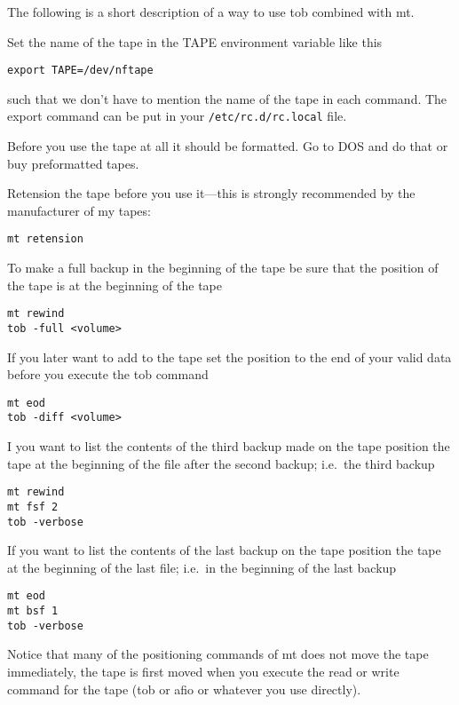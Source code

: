 \documentclass[12pt,a4paper]{article}
\begin{document}
\pagestyle{empty}

\parskip6pt
\parindent0pt

\def\cmd#1{\textsf{#1}}

\null
\vskip-3cm
\enlargethispage{3cm}
The following is a short description of a way to use \cmd{tob} combined
with \cmd{mt}.

Set the name of the tape in the \cmd{TAPE} environment variable like this
\begin{verbatim}
export TAPE=/dev/nftape
\end{verbatim}
such that we don't have to mention the name of the tape in each
command. The \cmd{export} command can be put in your
\verb+/etc/rc.d/rc.local+ file.

Before you use the tape at all it should be formatted. Go to DOS and
do that or buy preformatted tapes.

Retension the tape before you use it---this is strongly recommended by
the manufacturer of my tapes:
\begin{verbatim}
mt retension
\end{verbatim}

To make a full backup in the beginning of the tape be sure that the
position of the tape is at the beginning of the tape
\begin{verbatim}
mt rewind
tob -full <volume>
\end{verbatim}

If you later want to add to the tape set the position to the end of
your valid data before you execute the \cmd{tob} command
\begin{verbatim}
mt eod
tob -diff <volume>
\end{verbatim}

I you want to list the contents of the third backup made on the tape
position the tape at the beginning of the file after the second
backup; i.e.\ the third backup
\begin{verbatim}
mt rewind
mt fsf 2
tob -verbose 
\end{verbatim}

If you want to list the contents of the last backup on the tape
position the tape at the beginning of the last file; i.e.\ in the
beginning of the last backup
\begin{verbatim}
mt eod
mt bsf 1
tob -verbose 
\end{verbatim}

Notice that many of the positioning commands of \cmd{mt} does not move
the tape immediately, the tape is first moved when you execute the read
or write command for the tape (\cmd{tob} or \cmd{afio} or whatever you
use directly).
\end{document}
